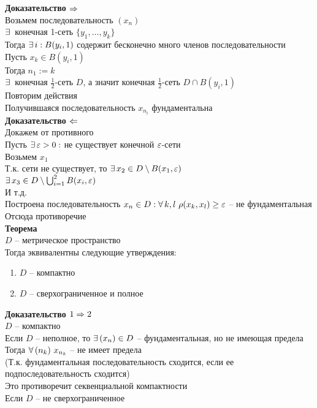 \documentclass[12pt]{article}
\begin{document}
\textbf{Доказательство $\Rightarrow$}\\
Возьмем последовательность $(x_n)$\\
$\exists\,$ конечная 1-сеть $\{y_1, \ldots, y_k\}$\\
Тогда $\exists\, i: B(y_i, 1)$ содержит бесконечно много членов последовательности\\
Пусть $x_k \in B(y_i, 1)$\\
Тогда $n_1 := k$\\
$\exists\,$ конечная $\frac12$-сеть $D$, а значит конечная $\frac12$-сеть $D \cap B(y_i, 1)$\\
Повторим действия\\
Получившаяся последовательность $x_{n_i}$ фундаментальна\\
\textbf{Доказательство $\Leftarrow$}\\
Докажем от противного\\
Пусть $\exists\, \varepsilon > 0:$ не существует конечной $\varepsilon$-сети\\
Возьмем $x_1$\\
Т.к. сети не существует, то $\exists\, x_2 \in D \setminus B(x_1, \varepsilon)$\\
$\exists\, x_3 \in D \setminus \bigcup_{i=1}^2 B(x_i, \varepsilon)$\\
И т.д.\\
Построена последовательность $x_n \in D: \forall\, k, l\ \rho(x_k, x_l) \geq \varepsilon$ -- не фундаментальная\\
Отсюда противоречие\\
\textbf{Теорема}\\
$D$ -- метрическое пространство\\
Тогда эквивалентны следующие утверждения:
\begin{enumerate}
    \item $D$ -- компактно
    \item $D$ -- сверхограниченное и полное
\end{enumerate}
\textbf{Доказательство $1 \Rightarrow 2$}\\
$D$ -- компактно\\
Если $D$ -- неполное, то $\exists\, (x_n) \in D$ -- фундаментальная, но не имеющая предела\\
Тогда $\forall\, (n_k)\ x_{n_k}$ -- не имеет предела\\
(Т.к. фундаментальная последовательность сходится, если ее подпоследовательность сходится)\\
Это противоречит секвенциальной компактности\\
Если $D$ -- не сверхограниченное\\
\end{document}
